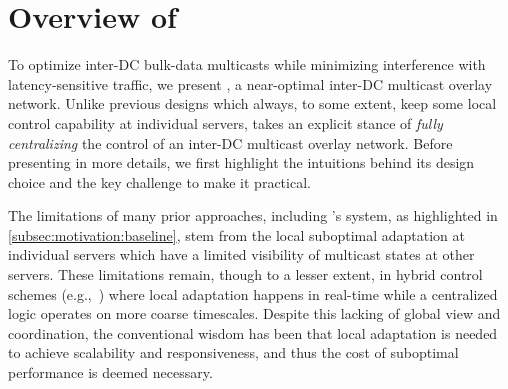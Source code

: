 \section{Overview of \name}
\label{sec:overview}

To optimize inter-DC bulk-data multicasts while minimizing
interference with latency-sensitive traffic, we present \name,
a near-optimal inter-DC multicast overlay network.
Unlike previous designs which always, to some extent, keep
some local control capability at individual servers,
\name takes an explicit stance of {\em fully centralizing} the
control of an inter-DC multicast overlay network.
Before presenting \name in more details,
we first highlight the intuitions behind its design
choice and the key challenge to make it practical.







The limitations of many prior approaches, including \company's
system, as highlighted in \Section\ref{subsec:motivation:baseline},
stem from the local suboptimal adaptation
at individual servers which have
a limited visibility of multicast states at
other servers.
These limitations remain, though to a lesser extent, in hybrid
control schemes (e.g.,~\cite{yin2009design}) where local
adaptation happens in real-time while a centralized logic
operates on more coarse timescales.
Despite this lacking of global view and coordination, the
conventional wisdom has
been that local adaptation is needed to achieve
scalability and responsiveness, and thus the cost of suboptimal
performance is deemed necessary.

